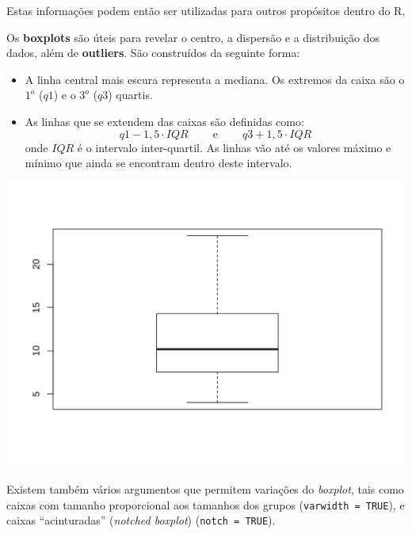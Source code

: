 \documentclass[10pt,a4paper]{book}
\newenvironment{Shaded}{\begin{snugshade}}{\end{snugshade}}
\newcommand{\KeywordTok}[1]{\textcolor[rgb]{0.13,0.29,0.53}{\textbf{#1}}}
\newcommand{\OperatorTok}[1]{\textcolor[rgb]{0.81,0.36,0.00}{\textbf{#1}}}
\newcommand{\NormalTok}[1]{#1}
\providecommand{\tightlist}{%
  \setlength{\itemsep}{0pt}\setlength{\parskip}{0pt}}
\begin{document}
Estas informações podem então ser utilizadas para outros propósitos
dentro do R.

Os \textbf{boxplots} são úteis para revelar o centro, a dispersão e a
distribuição dos dados, além de \textbf{outliers}. São construídos da
seguinte forma:

\begin{itemize}
\tightlist
\item
  A linha central mais escura representa a mediana. Os extremos da caixa
  são o \(1^{o}\) (\(q1\)) e o \(3^{o}\) (\(q3\)) quartis.
\item
  As linhas que se extendem das caixas são definidas como:
  \[q1-1,5\cdot IQR\ \qquad \mathrm{e}\ \qquad q3+1,5\cdot IQR\] onde
  \(IQR\) é o intervalo inter-quartil. As linhas vão até os valores
  máximo e mínimo que ainda se encontram dentro deste intervalo.
\end{itemize}

\begin{Shaded}
\end{Shaded}

\begin{center}\includegraphics{figures/unnamed-chunk-311-1} \end{center}

Existem também vários argumentos que permitem variações do
\emph{boxplot}, tais como caixas com tamanho proporcional aos tamanhos
dos grupos (\texttt{varwidth\ =\ TRUE}), e caixas ``acinturadas''
(\emph{notched boxplot}) (\texttt{notch\ =\ TRUE}).
\end{document}
